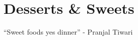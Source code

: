 \AddToShipoutPicture*{\AppleTartLarge}
\chapter{Desserts \& Sweets}

``Sweet foods yes dinner'' - Pranjal Tiwari